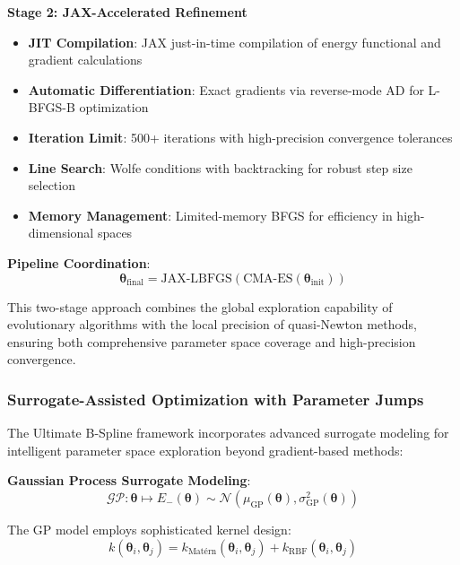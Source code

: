 \documentclass[12pt,a4paper]{article}
\begin{document}
\textbf{Stage 2: JAX-Accelerated Refinement}
\begin{itemize}
\item \textbf{JIT Compilation}: JAX just-in-time compilation of energy functional and gradient calculations
\item \textbf{Automatic Differentiation}: Exact gradients via reverse-mode AD for L-BFGS-B optimization
\item \textbf{Iteration Limit}: 500+ iterations with high-precision convergence tolerances
\item \textbf{Line Search}: Wolfe conditions with backtracking for robust step size selection
\item \textbf{Memory Management}: Limited-memory BFGS for efficiency in high-dimensional spaces
\end{itemize}

\textbf{Pipeline Coordination}:
\begin{equation}
\boldsymbol{\theta}_{\text{final}} = \text{JAX-LBFGS}(\text{CMA-ES}(\boldsymbol{\theta}_{\text{init}}))
\end{equation}

This two-stage approach combines the global exploration capability of evolutionary algorithms with the local precision of quasi-Newton methods, ensuring both comprehensive parameter space coverage and high-precision convergence.

\subsubsection{Surrogate-Assisted Optimization with Parameter Jumps}

The Ultimate B-Spline framework incorporates advanced surrogate modeling for intelligent parameter space exploration beyond gradient-based methods:

\textbf{Gaussian Process Surrogate Modeling}:
\begin{equation}
\mathcal{GP}: \boldsymbol{\theta} \mapsto E_-(\boldsymbol{\theta}) \sim \mathcal{N}(\mu_{\text{GP}}(\boldsymbol{\theta}), \sigma_{\text{GP}}^2(\boldsymbol{\theta}))
\end{equation}

The GP model employs sophisticated kernel design:
\begin{equation}
k(\boldsymbol{\theta}_i, \boldsymbol{\theta}_j) = k_{\text{Mat\'ern}}(\boldsymbol{\theta}_i, \boldsymbol{\theta}_j) + k_{\text{RBF}}(\boldsymbol{\theta}_i, \boldsymbol{\theta}_j)
\end{equation}
\end{document}
